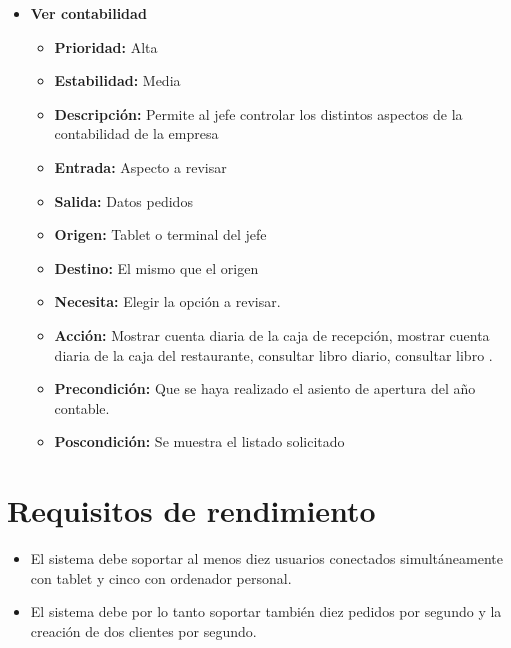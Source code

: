 \documentclass[spanish,a4paper,12pt]{report}	%
\begin{document}
\begin{itemize}
\begin{itemize}
		\end{itemize}%

		\item \textbf{Ver contabilidad} %

		\begin{itemize}

			\item \textbf{Prioridad: }Alta
			\item \textbf{Estabilidad: }Media
			\item \textbf{Descripción: }Permite al jefe controlar los distintos aspectos de la contabilidad de la empresa
			\item \textbf{Entrada: } Aspecto a revisar
			\item \textbf{Salida: } Datos pedidos
			\item \textbf{Origen: } Tablet o terminal del jefe
			\item \textbf{Destino: } El mismo que el origen
			\item \textbf{Necesita: } Elegir la opción a revisar.
			\item \textbf{Acción: }Mostrar cuenta diaria de la caja de recepción, mostrar cuenta diaria de la caja del restaurante, consultar libro diario, consultar libro .
			\item \textbf{Precondición: } Que se haya realizado el asiento de apertura del año contable.
			\item \textbf{Poscondición: } Se muestra el listado solicitado

		\end{itemize}%

\end{itemize}%

\section{Requisitos de rendimiento}
\begin{itemize}
	\item El sistema debe soportar al menos diez usuarios conectados simultáneamente con tablet y cinco con ordenador personal.
	\item El sistema debe por lo tanto soportar también diez pedidos por segundo y la creación de dos clientes por segundo. 
\end{itemize}
\end{document}
